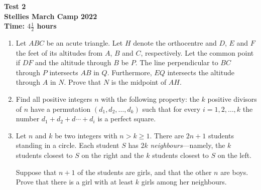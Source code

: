 \documentclass{article}
\begin{document}
\thispagestyle{empty}

\begin{center}
  \textbf{\Large Test 2}
  \\ \vspace{1em}
  \textbf{\large Stellies March Camp 2022}
  \\ \vspace{1em}
  \textbf{\large Time: $4\frac{1}{2}$ hours}
\end{center}

\vspace{24pt}

\begin{enumerate}[itemsep=12pt]

\item %
Let $ABC$ be an acute triangle.
Let $H$ denote the orthocentre and $D$, $E$ and $F$ the feet of its altitudes from $A$, $B$ and $C$, respectively.
Let the common point if $DF$ and the altitude through $B$ be $P$.
The line perpendicular to $BC$ through $P$ intersects $AB$ in $Q$.
Furthermore, $EQ$ intersects the altitude through $A$ in $N$.
Prove that $N$ is the midpoint of $AH$.

\item %
Find all positive integers $n$ with the following property:
the $k$ positive divisors of $n$ have a permutation $(d_1, d_2, \dotsc, d_k)$ such that for every $i = 1, 2, \dotsc, k$ the number $d_1 +d_2 +d\dotsb +d_i$ is a perfect square.

\item %
Let $n$ and $k$ be two integers with $n > k \geq 1$.
There are $2n+1$ students standing in a circle.
Each student $S$ has $2k$ \emph{neighbours}---namely, the $k$ students closest to $S$ on the right and the $k$ students closest to $S$ on the left.

Suppose that $n+1$ of the students are girls, and that the other $n$ are boys.
Prove that there is a girl with at least $k$ girls among her neighbours.

\end{enumerate}

\vfill
\centering
\begin{BVerbatim}
\end{BVerbatim}
\end{document}
